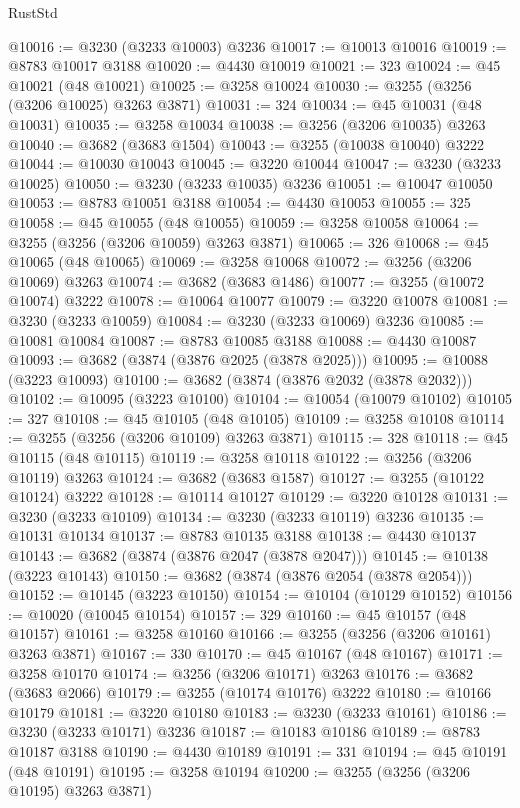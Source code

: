 \begin{lexlean}{RustStd}
\begin{coremodule}
@10016 := @3230 (@3233 @10003) @3236
@10017 := @10013 @10016
@10019 := @8783 @10017 @3188
@10020 := @4430 @10019
@10021 := 323
@10024 := @45 @10021 (@48 @10021)
@10025 := @3258 @10024
@10030 := @3255 (@3256 (@3206 @10025) @3263 @3871)
@10031 := 324
@10034 := @45 @10031 (@48 @10031)
@10035 := @3258 @10034
@10038 := @3256 (@3206 @10035) @3263
@10040 := @3682 (@3683 @1504)
@10043 := @3255 (@10038 @10040) @3222
@10044 := @10030 @10043
@10045 := @3220 @10044
@10047 := @3230 (@3233 @10025)
@10050 := @3230 (@3233 @10035) @3236
@10051 := @10047 @10050
@10053 := @8783 @10051 @3188
@10054 := @4430 @10053
@10055 := 325
@10058 := @45 @10055 (@48 @10055)
@10059 := @3258 @10058
@10064 := @3255 (@3256 (@3206 @10059) @3263 @3871)
@10065 := 326
@10068 := @45 @10065 (@48 @10065)
@10069 := @3258 @10068
@10072 := @3256 (@3206 @10069) @3263
@10074 := @3682 (@3683 @1486)
@10077 := @3255 (@10072 @10074) @3222
@10078 := @10064 @10077
@10079 := @3220 @10078
@10081 := @3230 (@3233 @10059)
@10084 := @3230 (@3233 @10069) @3236
@10085 := @10081 @10084
@10087 := @8783 @10085 @3188
@10088 := @4430 @10087
@10093 := @3682 (@3874 (@3876 @2025 (@3878 @2025)))
@10095 := @10088 (@3223 @10093)
@10100 := @3682 (@3874 (@3876 @2032 (@3878 @2032)))
@10102 := @10095 (@3223 @10100)
@10104 := @10054 (@10079 @10102)
@10105 := 327
@10108 := @45 @10105 (@48 @10105)
@10109 := @3258 @10108
@10114 := @3255 (@3256 (@3206 @10109) @3263 @3871)
@10115 := 328
@10118 := @45 @10115 (@48 @10115)
@10119 := @3258 @10118
@10122 := @3256 (@3206 @10119) @3263
@10124 := @3682 (@3683 @1587)
@10127 := @3255 (@10122 @10124) @3222
@10128 := @10114 @10127
@10129 := @3220 @10128
@10131 := @3230 (@3233 @10109)
@10134 := @3230 (@3233 @10119) @3236
@10135 := @10131 @10134
@10137 := @8783 @10135 @3188
@10138 := @4430 @10137
@10143 := @3682 (@3874 (@3876 @2047 (@3878 @2047)))
@10145 := @10138 (@3223 @10143)
@10150 := @3682 (@3874 (@3876 @2054 (@3878 @2054)))
@10152 := @10145 (@3223 @10150)
@10154 := @10104 (@10129 @10152)
@10156 := @10020 (@10045 @10154)
@10157 := 329
@10160 := @45 @10157 (@48 @10157)
@10161 := @3258 @10160
@10166 := @3255 (@3256 (@3206 @10161) @3263 @3871)
@10167 := 330
@10170 := @45 @10167 (@48 @10167)
@10171 := @3258 @10170
@10174 := @3256 (@3206 @10171) @3263
@10176 := @3682 (@3683 @2066)
@10179 := @3255 (@10174 @10176) @3222
@10180 := @10166 @10179
@10181 := @3220 @10180
@10183 := @3230 (@3233 @10161)
@10186 := @3230 (@3233 @10171) @3236
@10187 := @10183 @10186
@10189 := @8783 @10187 @3188
@10190 := @4430 @10189
@10191 := 331
@10194 := @45 @10191 (@48 @10191)
@10195 := @3258 @10194
@10200 := @3255 (@3256 (@3206 @10195) @3263 @3871)

\end{coremodule}
\end{lexlean}
